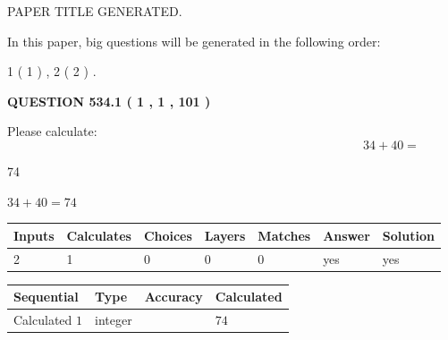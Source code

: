 \documentclass[12pt]{article}
\begin{document}
   
 PAPER TITLE GENERATED.
   
   
   
\vspace{0.2in}
   
In this paper, big questions will be generated in the following order: 
   
   
   1 ( 1 )
 ,
   2 ( 2 )
 .
  
\vspace{0.2in}
  
{\textbf{\Large{QUESTION
534.1 
 ( 1 , 1 , 101 )
}}}
  
  
 
Please calculate:
\begin{equation}
34 +  %
40 = \nonumber
\end{equation}
 
 
 
\noindent{}
 
 

74
 
 
\noindent{}
 
 

 
 
 
\noindent{}
 
 

$ %
34 +  %
40=   %
74$
 
 
\noindent{}
 
 

 
   
   
   
   
\noindent\begin{tabular}{|l|l|l|l|l|l|l|}
 \hline
Inputs & Calculates & Choices & Layers & Matches & Answer & Solution \\ \hline
 2  & 
 1  & 
 0
  & 
 0  & 
 0  & 
  yes & 
  yes 
  \\ \hline
 \end{tabular}
   
   
   
   
\noindent{}
   
   
  
  
\noindent\begin{tabular}{|l|l|l|l|}
\hline
 Sequential & Type & Accuracy & Calculated \\ 
\hline
 
 
  Calculated $  1 $ & integer &  & 
  $ 74 $ 
 \\  \hline  
 \end{tabular}
   
\end{document}
